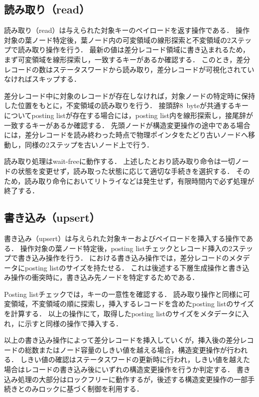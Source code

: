 \subsection{読み取り（read）}
読み取り（read）は与えられた対象キーのペイロードを返す操作である．
操作対象の葉ノード特定後，葉ノード内の可変領域の線形探索と不変領域の2ステップで読み取り操作を行う．
最新の値は差分レコード領域に書き込まれるため，まず可変領域を線形探索し，一致するキーがあるか確認する．
このとき，差分レコードの数はステータスワードから読み取り，差分レコードが可視化されていなければスキップする．

差分レコード中に対象のレコードが存在しなければ，対象ノードの特定時に保持した位置をもとに，不変領域の読み取りを行う．
接頭辞8~byteが共通するキーについてposting listが存在する場合には，posting list内を線形探索し，接尾辞が一致するキーがあるか確認する．
先頭ノードが構造変更操作の途中である場合には，差分レコードを読み終わった時点で物理ポインタをたどり古いノードへ移動し，同様の2ステップを古いノード上で行う．

読み取り処理はwait-freeに動作する．
上述したとおり読み取り命令は一切ノードの状態を変更せず，読み取った状態に応じて適切な手続きを選択する．
そのため，読み取り命令においてリトライなどは発生せず，有限時間内で必ず処理が終了する．

\subsection{書き込み（upsert）}
書き込み（upsert）は与えられた対象キーおよびペイロードを挿入する操作である．
操作対象の葉ノード特定後，posting listチェックとレコード挿入の2ステップで書き込み操作を行う．
\Bcforest{}における書き込み操作では，差分レコードのメタデータにposting listのサイズを持たせる．
これは後述する下層生成操作と書き込み操作の衝突時に，書き込み先ノードを特定するためである．

Posting listチェックでは，キーの一意性を確認する．
読み取り操作と同様に可変領域，不変領域の順に探索し，挿入するレコードを含めたposting listのサイズを計算する．
以上の操作にて，取得したposting listのサイズをメタデータに入れ，\Fig{\ref{fig:bc_tree_insertion}}に示す\Bctree{}と同様の操作で挿入する．

以上の書き込み操作によって差分レコードを挿入していくが，挿入後の差分レコードの総数またはノード容量のしきい値を越える場合，構造変更操作が行われる．
しきい値の確認はステータスワードの更新時に行われ，しきい値を越えた場合はレコードの書き込み後にいずれの構造変更操作を行うか判定する．
書き込み処理の大部分はロックフリーに動作するが，後述する構造変更操作の一部手続きとのみロックに基づく制御を利用する．

